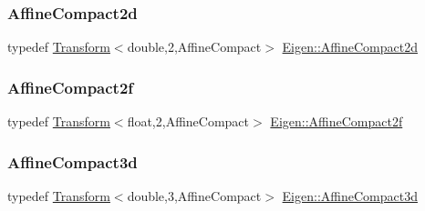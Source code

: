 \mbox{\label{group___geometry___module_ga635eb91d48c86041a21d7616fff7888e}} 
\subsubsection{\texorpdfstring{AffineCompact2d}{AffineCompact2d}}
{\footnotesize\ttfamily typedef \mbox{\hyperlink{class_eigen_1_1_transform}{Transform}}$<$double,2,Affine\+Compact$>$ \mbox{\hyperlink{group___geometry___module_ga635eb91d48c86041a21d7616fff7888e}{Eigen\+::\+Affine\+Compact2d}}}

\mbox{\label{group___geometry___module_gae88f296fba2a506eb3397569d762da27}} 
\subsubsection{\texorpdfstring{AffineCompact2f}{AffineCompact2f}}
{\footnotesize\ttfamily typedef \mbox{\hyperlink{class_eigen_1_1_transform}{Transform}}$<$float,2,Affine\+Compact$>$ \mbox{\hyperlink{group___geometry___module_gae88f296fba2a506eb3397569d762da27}{Eigen\+::\+Affine\+Compact2f}}}

\mbox{\label{group___geometry___module_gabcf74c0e194ea4e487284e28a9817a34}} 
\subsubsection{\texorpdfstring{AffineCompact3d}{AffineCompact3d}}
{\footnotesize\ttfamily typedef \mbox{\hyperlink{class_eigen_1_1_transform}{Transform}}$<$double,3,Affine\+Compact$>$ \mbox{\hyperlink{group___geometry___module_gabcf74c0e194ea4e487284e28a9817a34}{Eigen\+::\+Affine\+Compact3d}}}

\mbox{\label{group___geometry___module_ga372437883db5fe0332141ae30d4f501a}} 
